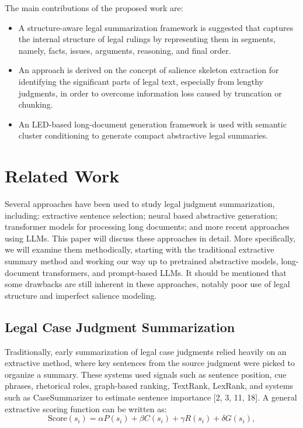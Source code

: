 \documentclass[11pt, a4paper]{article}
\theoremstyle{plain}%
\theoremstyle{remark}%
\theoremstyle{definition}%
\begin{document}
The main contributions of the proposed work are:
\begin{itemize}
    \item A structure-aware legal summarization framework is suggested that captures the internal structure of legal rulings by representing them in segments, namely, facts, issues, arguments, reasoning, and final order.
    \item An approach is derived on the concept of salience skeleton extraction for identifying the significant parts of legal text, especially from lengthy judgments, in order to overcome information loss caused by truncation or chunking.
    \item An LED-based long-document generation framework is used with semantic cluster conditioning to generate compact abstractive legal summaries.
\end{itemize}

\section{Related Work}

Several approaches have been used to study legal judgment summarization, including: extractive sentence selection; neural based abstractive generation; transformer models for processing long documents; and more recent approaches using LLMs. This paper will discuss these approaches in detail. 
More specifically, we will examine them methodically, starting with the traditional extractive summary method and working our way up to pretrained abstractive models, long-document transformers, and prompt-based LLMs.
It should be mentioned that some drawbacks are still inherent in these approaches, notably poor use of legal structure and imperfect salience modeling. 


\subsection{Legal Case Judgment Summarization}

Traditionally, early summarization of legal case judgments relied heavily on an extractive method, where key sentences from the source judgment were picked to organize a summary. These systems used signals such as sentence position, cue phrases, rhetorical roles, graph-based ranking, TextRank, LexRank, and systems such as CaseSummarizer to estimate sentence importance [2, 3, 11, 18]. A general extractive scoring function can be written as:
\begin{equation}
\text{Score}(s_i) = \alpha P(s_i) + \beta C(s_i) + \gamma R(s_i) + \delta G(s_i),
\end{equation}
\end{document}
